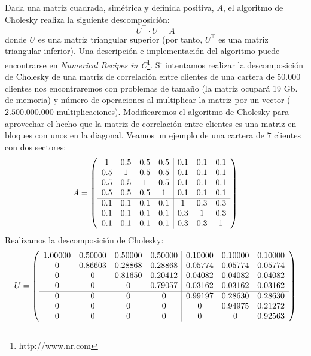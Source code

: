 Dada una matriz cuadrada, sim\'etrica y definida positiva, $A$, el algoritmo
de Cholesky realiza la siguiente descomposici\'on:
\begin{displaymath}
U^{\top} \cdot U = A
\end{displaymath}
donde $U$ es una matriz triangular superior (por tanto, $U^{\top}$ es una matriz
triangular inferior). Una descripci\'on e implementaci\'on del algoritmo puede
encontrarse en \emph{Numerical Recipes in C}\footnote{http://www.nr.com}.
\newline
\newline
Si intentamos realizar la descomposici\'on de Cholesky de una matriz de correlaci\'on
entre clientes de una cartera de $50.000$ clientes nos encontraremos con problemas
de tama\~no (la matriz ocupar\'a 19 Gb. de memoria) y n\'umero de operaciones al
multiplicar la matriz por un vector ($2.500.000.000$ multiplicaciones).
\newline
\newline
Modificaremos el algoritmo de Cholesky para aprovechar el hecho que la matriz
de correlaci\'on entre clientes es una matriz en bloques con unos en la diagonal.
Veamos un ejemplo de una cartera de $7$ clientes con dos sectores:
\begin{displaymath}
A = \left(
\begin{array}{cccc|ccc}
1   & 0.5 & 0.5 & 0.5 & 0.1 & 0.1 & 0.1 \cr
0.5 & 1   & 0.5 & 0.5 & 0.1 & 0.1 & 0.1 \cr
0.5 & 0.5 & 1   & 0.5 & 0.1 & 0.1 & 0.1 \cr
0.5 & 0.5 & 0.5 & 1   & 0.1 & 0.1 & 0.1 \cr
\hline
0.1 & 0.1 & 0.1 & 0.1 & 1   & 0.3 & 0.3 \cr
0.1 & 0.1 & 0.1 & 0.1 & 0.3 & 1   & 0.3 \cr
0.1 & 0.1 & 0.1 & 0.1 & 0.3 & 0.3 & 1
\end{array}
\right)
\end{displaymath}
Realizamos la descomposici\'on de Cholesky:
\begin{displaymath}
U = \left(
\begin{array}{cccc|ccc}
 1.00000 & 0.50000 & 0.50000 & 0.50000 & 0.10000 & 0.10000 & 0.10000 \cr
 0       & 0.86603 & 0.28868 & 0.28868 & 0.05774 & 0.05774 & 0.05774 \cr
 0       & 0       & 0.81650 & 0.20412 & 0.04082 & 0.04082 & 0.04082 \cr
 0       & 0       & 0       & 0.79057 & 0.03162 & 0.03162 & 0.03162 \cr
\hline
 0       & 0       & 0       & 0       & 0.99197 & 0.28630 & 0.28630 \cr
 0       & 0       & 0       & 0       & 0       & 0.94975 & 0.21272 \cr
 0       & 0       & 0       & 0       & 0       & 0       & 0.92563
\end{array}
\right)
\end{displaymath}

